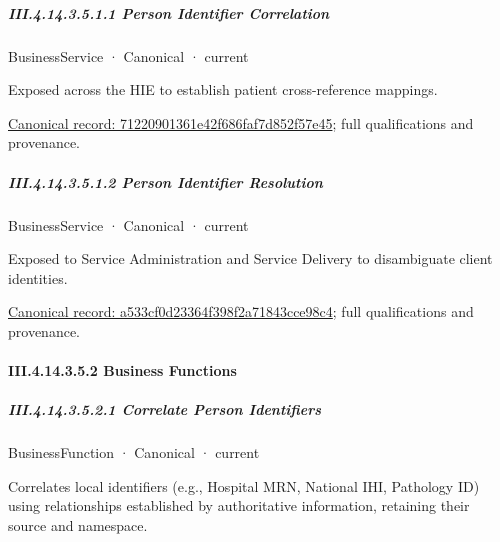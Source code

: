 \subparagraph*{III.4.14.3.5.1.1 Person Identifier Correlation}
\label{navigation:III.4.14.3.5.1.1}

\label{element:71220901361e42f686faf7d852f57e45}
{\small BusinessService · Canonical · current}\par

Exposed across the HIE to establish patient cross-reference mappings.


{\footnotesize \href{../../../../../../../../continuum/business/business-service/71220901361e42f686faf7d852f57e45.md}{Canonical record: 71220901361e42f686faf7d852f57e45}; full qualifications and provenance.}\par
\subparagraph*{III.4.14.3.5.1.2 Person Identifier Resolution}
\label{navigation:III.4.14.3.5.1.2}

\label{element:a533cf0d23364f398f2a71843cce98c4}
{\small BusinessService · Canonical · current}\par

Exposed to Service Administration and Service Delivery to disambiguate client identities.


{\footnotesize \href{../../../../../../../../continuum/business/business-service/a533cf0d23364f398f2a71843cce98c4.md}{Canonical record: a533cf0d23364f398f2a71843cce98c4}; full qualifications and provenance.}\par
\paragraph*{III.4.14.3.5.2 Business Functions}
\label{navigation:III.4.14.3.5.2}

\subparagraph*{III.4.14.3.5.2.1 Correlate Person Identifiers}
\label{navigation:III.4.14.3.5.2.1}

\label{element:3050366e2e1d47eeaa4cfd6db92c0a56}
{\small BusinessFunction · Canonical · current}\par

Correlates local identifiers (e.g., Hospital MRN, National IHI, Pathology ID) using relationships established by authoritative information, retaining their source and namespace.


